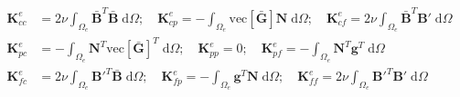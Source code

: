 \documentclass[11pt]{amsart}
\begin{document}
\begin{align}
  \boldsymbol{K}_{cc}^e  &=  2\nu \int_{\Omega_e}  \bar{\boldsymbol{B}}^T \bar{\boldsymbol{B}} \; \mathrm{d} \Omega ; \quad
\boldsymbol{K}_{cp}^e  =  - \int_{\Omega_e}  \mathrm{vec}[\bar{\boldsymbol{G}}]\boldsymbol{N} \; \mathrm{d} \Omega ; \quad
\boldsymbol{K}_{cf}^e  =  2\nu \int_{\Omega_e}  \bar{\boldsymbol{B}}^T \boldsymbol{B}'  \; \mathrm{d} \Omega \nonumber \\
\boldsymbol{K}_{pc}^e  &=  - \int_{\Omega_e} \boldsymbol{N}^T  \mathrm{vec}[\bar{\boldsymbol{G}}]^T \; \mathrm{d} \Omega ; \quad
\boldsymbol{K}_{pp}^e   =  0 ; \quad
\boldsymbol{K}_{pf}^e  =  - \int_{\Omega_e} \boldsymbol{N}^T {\boldsymbol{g}}^T  \; \mathrm{d} \Omega \nonumber \\
\boldsymbol{K}_{fc}^e  &=  2\nu \int_{\Omega_e}  {\boldsymbol{B}'}^T\bar{\boldsymbol{B}}
 \; \mathrm{d} \Omega ; \quad
\boldsymbol{K}_{fp}^e  =   - \int_{\Omega_e} {\boldsymbol{g}}^T \boldsymbol{N}\; \mathrm{d} \Omega ; \quad
\boldsymbol{K}_{ff}^e  =  2\nu \int_{\Omega_e}  {\boldsymbol{B}'}^T\boldsymbol{B}'\; \mathrm{d} \Omega 
\end{align}
\end{document}
